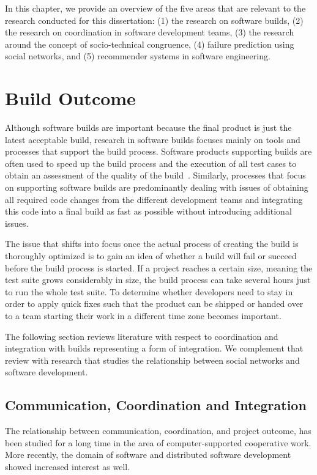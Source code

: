 \label{chap:bg}
In this chapter, we provide an overview of the five areas that are relevant to the research conducted for this dissertation: (1) the research on software builds, (2) the research on coordination in software development teams, (3) the research around the concept of socio-technical congruence, (4) failure prediction using social networks, and (5) recommender systems in software engineering.

\section{Build Outcome}
\label{sec:RelatedCommunication}
Although software builds are important because the final product is just the latest acceptable build, research in software builds focuses mainly on tools and processes that support the build process.
Software products supporting builds are often used to speed up the build process and the execution of all test cases to obtain an assessment of the quality of the build~\cite{maraia:book:2005}.
Similarly, processes that focus on supporting software builds are predominantly dealing with issues of obtaining all required code changes from the different development teams and integrating this code into a final build as fast as possible without introducing additional issues.

The issue that shifts into focus once the actual process of creating the build is thoroughly optimized is to gain an idea of whether a build will fail or succeed before the build process is started.
If a project reaches a certain size, meaning the test suite grows considerably in size, the build process can take several hours just to run the whole test suite.
To determine whether developers need to stay in order to apply quick fixes such that the product can be shipped or handed over to a team starting their work in a different time zone becomes important.

The following section reviews literature with respect to coordination and integration with builds representing a form of integration.
We complement that review with research that studies the relationship between social networks and software development.

\vspace{-5pt}
\subsection{Communication, Coordination and Integration}
\vspace{-5pt}
The relationship between communication, coordination, and project outcome, has been
studied for a long time in the area of computer-supported cooperative work. More
recently, the domain of software and distributed software development showed
increased interest as well.

